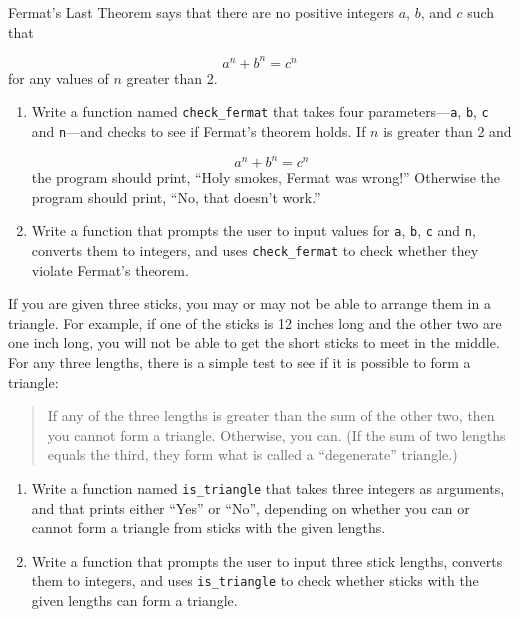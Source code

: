 \documentclass[10pt]{book}
\begin{document}
\begin{exercise}

Fermat's Last Theorem says that there are no positive integers
$a$, $b$, and $c$ such that

\[ a^n + b^n = c^n \]
%
for any values of $n$ greater than 2.

\begin{enumerate}

\item Write a function named \verb"check_fermat" that takes four
parameters---{\tt a}, {\tt b}, {\tt c} and {\tt n}---and
checks to see if Fermat's theorem holds.  If
$n$ is greater than 2 and 

\[a^n + b^n = c^n \]
%
the program should print, ``Holy smokes, Fermat was wrong!''
Otherwise the program should print, ``No, that doesn't work.''

\item Write a function that prompts the user to input values
for {\tt a}, {\tt b}, {\tt c} and {\tt n}, converts them to
integers, and uses \verb"check_fermat" to check whether they
violate Fermat's theorem.

\end{enumerate}

\end{exercise}


\begin{exercise}

If you are given three sticks, you may or may not be able to arrange
them in a triangle.  For example, if one of the sticks is 12 inches
long and the other two are one inch long, you will
not be able to get the short sticks to meet in the middle.  For any
three lengths, there is a simple test to see if it is possible to form
a triangle:

\begin{quotation}
If any of the three lengths is greater than the sum of the other
  two, then you cannot form a triangle.  Otherwise, you
  can.  (If the sum of two lengths equals the third, they form
    what is called a ``degenerate'' triangle.)
\end{quotation}

\begin{enumerate}

\item Write a function named \verb"is_triangle" that takes three
  integers as arguments, and that prints either ``Yes'' or ``No'', depending
  on whether you can or cannot form a triangle from sticks with the
  given lengths.

\item Write a function that prompts the user to input three stick
  lengths, converts them to integers, and uses \verb"is_triangle" to
  check whether sticks with the given lengths can form a triangle.

\end{enumerate}

\end{exercise}
\end{document}
